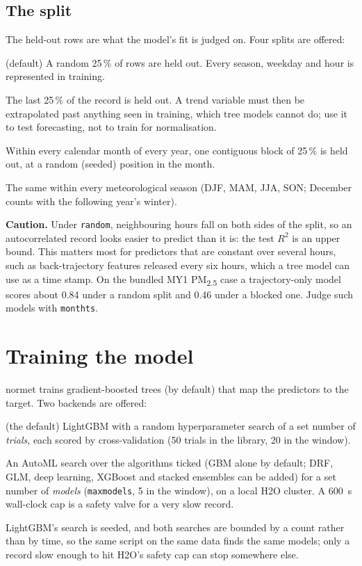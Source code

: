 \documentclass[11pt]{report}
\newcommand{\nosep}{\setlength{\itemsep}{0pt}\setlength{\parskip}{0pt}\setlength{\topsep}{2pt}}
\newcommand{\nm}{\textsf{normet}}
\newcommand{\codeunderscore}{\textunderscore\allowbreak}
\newcommand{\code}[1]{\texttt{\let\_\codeunderscore #1}}
\newcommand{\PMtwo}{PM\textsubscript{2.5}}
\newcommand{\caution}[1]{\par\noindent\colorbox{warn!15}{\parbox{0.97\linewidth}{\small\textbf{Caution.} #1}}\par}
\begin{document}
\subsection{The split}\label{sec:split}
The held-out rows are what the model's fit is judged on. Four splits are offered:
\begin{description}\nosep
  \item[\code{random}] (default) A random 25\,\% of rows are held out. Every season,
        weekday and hour is represented in training.
  \item[\code{ts}] The last 25\,\% of the record is held out. A trend variable must then
        be extrapolated past anything seen in training, which tree models cannot do;
        use it to test forecasting, not to train for normalisation.
  \item[\code{month\_ts}] Within every calendar month of every year, one contiguous
        block of 25\,\% is held out, at a random (seeded) position in the month.
  \item[\code{season\_ts}] The same within every meteorological season (DJF, MAM, JJA,
        SON; December counts with the following year's winter).
\end{description}

\caution{Under \code{random}, neighbouring hours fall on both sides of the split, so an
autocorrelated record looks easier to predict than it is: the test $R^2$ is an upper
bound. This matters most for predictors that are constant over several hours, such as
back-trajectory features released every six hours, which a tree model can use as a time
stamp. On the bundled MY1 \PMtwo{} case a trajectory-only model scores about 0.84 under a
random split and 0.46 under a blocked one. Judge such models with \code{month\_ts}.}

\section{Training the model}\label{sec:train}
\nm{} trains gradient-boosted trees (by default) that map the predictors to the target.
Two backends are offered:
\begin{description}\nosep
  \item[LightGBM] (the default) LightGBM with a random hyperparameter search of a set
        number of \emph{trials}, each scored by cross-validation (50 trials in the
        library, 20 in the window).
  \item[H2O AutoML] An AutoML search over the algorithms ticked (GBM alone by default;
        DRF, GLM, deep learning, XGBoost and stacked ensembles can be added) for a set
        number of \emph{models} (\code{max\_models}, 5 in the window), on a local H2O
        cluster. A 600~s wall-clock cap is a safety valve for a very slow record.
\end{description}
LightGBM's search is seeded, and both searches are bounded by a count rather than by
time, so the same script on the same data finds the same models; only a record slow
enough to hit H2O's safety cap can stop somewhere else.
\end{document}

